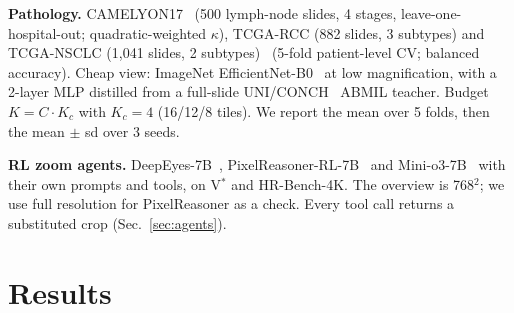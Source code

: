 \documentclass[10pt,twocolumn,letterpaper]{article}
\begin{document}
\textbf{Pathology.} CAMELYON17~\cite{camelyon17} (500 lymph-node slides, 4 stages, leave-one-hospital-out; quadratic-weighted $\kappa$), TCGA-RCC (882 slides, 3 subtypes) and TCGA-NSCLC (1{,}041 slides, 2 subtypes)~\cite{tcga} (5-fold patient-level CV; balanced accuracy). Cheap view: ImageNet EfficientNet-B0~\cite{tan2019efficientnet} at low magnification, with a 2-layer MLP distilled from a full-slide UNI/CONCH~\cite{uni,conch} ABMIL teacher. Budget $K=C\cdot K_c$ with $K_c=4$ (16/12/8 tiles). We report the mean over 5 folds, then the mean $\pm$ sd over 3 seeds.

\textbf{RL zoom agents.} DeepEyes-7B~\cite{zheng2025deepeyes}, PixelReasoner-RL-7B~\cite{pixelreasoner} and Mini-o3-7B~\cite{minio3} with their own prompts and tools, on V$^*$ and HR-Bench-4K. The overview is 768$^2$; we use full resolution for PixelReasoner as a check. Every tool call returns a substituted crop (Sec.~\ref{sec:agents}).

\section{Results}\label{sec:results}
\end{document}
